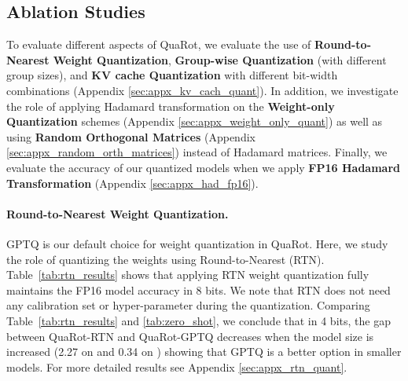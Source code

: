 \subsection{Ablation Studies}\label{sec:ablation_study}

To evaluate different aspects of QuaRot, we evaluate the use of \textbf{Round-to-Nearest Weight Quantization}, \textbf{Group-wise Quantization} (with different group sizes), and \textbf{KV cache Quantization} with different bit-width combinations (Appendix \ref{sec:appx_kv_cach_quant}). In addition, we investigate the role of applying Hadamard transformation on the \textbf{Weight-only Quantization} schemes (Appendix \ref{sec:appx_weight_only_quant}) as well as using \textbf{Random Orthogonal Matrices} (Appendix \ref{sec:appx_random_orth_matrices}) instead of Hadamard matrices. Finally, we evaluate the accuracy of our quantized models when we apply \textbf{FP16 Hadamard Transformation} (Appendix \ref{sec:appx_had_fp16}).


\paragraph{Round-to-Nearest Weight Quantization.} GPTQ is our default choice for weight quantization in QuaRot. Here, we study the role of quantizing the weights using Round-to-Nearest (RTN). Table~\ref{tab:rtn_results} shows that applying RTN weight quantization fully maintains the FP16 model accuracy in 8 bits. We note that RTN does not need any calibration set or hyper-parameter during the quantization. Comparing Table~\ref{tab:rtn_results} and \ref{tab:zero_shot}, we conclude that in 4 bits, the gap between QuaRot-RTN and QuaRot-GPTQ decreases when the model size is increased (2.27 on \llamaSmall and 0.34 on \llamaBig) showing that GPTQ is a better option in smaller models. For more detailed results see Appendix \ref{sec:appx_rtn_quant}.


